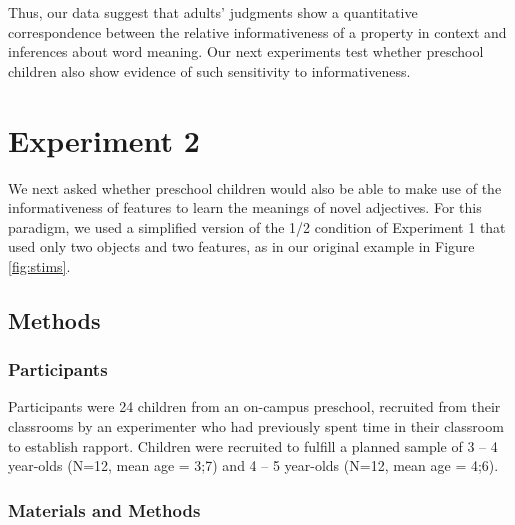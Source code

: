 \documentclass[review]{elsarticle}
\begin{document}

Thus, our data suggest that adults' judgments show a quantitative correspondence between the relative informativeness of a property in context and inferences about word meaning. Our next experiments test whether preschool children also show evidence of such sensitivity to informativeness.


\section{Experiment 2}

We next asked whether preschool children would also be able to make use of the informativeness of features to learn the meanings of novel adjectives. For this paradigm, we used a simplified version of the 1/2 condition of Experiment 1 that used only two objects and two features, as in our original example in Figure \ref{fig:stims}. 

\subsection{Methods}

\subsubsection{Participants}

Participants were 24 children from an on-campus preschool, recruited from their classrooms by an experimenter who had previously spent time in their classroom to establish rapport. Children were recruited to fulfill a planned sample of 3 -- 4 year-olds (N=12, mean age = 3;7) and 4 -- 5 year-olds (N=12, mean age = 4;6). 

\subsubsection{Materials and Methods}
\end{document}
